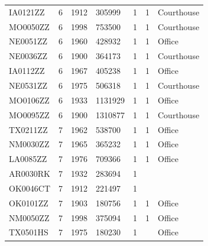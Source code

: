 \documentclass[12pt]{article}
\begin{document}
\begin{longtable}{lllllll}
IA0121ZZ         & 6      & 1912        & 305999                     & 1     & 1            & Courthouse                       \\
MO0050ZZ         & 6      & 1998        & 753500                     & 1     & 1            & Courthouse                       \\
NE0051ZZ         & 6      & 1960        & 428932                     & 1     & 1            & Office                           \\
NE0036ZZ         & 6      & 1900        & 364173                     & 1     & 1            & Courthouse                       \\
IA0112ZZ         & 6      & 1967        & 405238                     & 1     & 1            & Office                           \\
NE0531ZZ         & 6      & 1975        & 506318                     & 1     & 1            & Courthouse                       \\
MO0106ZZ         & 6      & 1933        & 1131929                    & 1     & 1            & Office                           \\
MO0095ZZ         & 6      & 1900        & 1310877                    & 1     & 1            & Courthouse                       \\
TX0211ZZ         & 7      & 1962        & 538700                     & 1     & 1            & Office                           \\
NM0030ZZ         & 7      & 1965        & 365232                     & 1     & 1            & Office                           \\
LA0085ZZ         & 7      & 1976        & 709366                     & 1     & 1            & Office                           \\
AR0030RK         & 7      & 1932        & 283694                     & 1     &              &                                  \\
OK0046CT         & 7      & 1912        & 221497                     & 1     &              &                                  \\
OK0101ZZ         & 7      & 1903        & 180756                     & 1     & 1            & Office                           \\
NM0050ZZ         & 7      & 1998        & 375094                     & 1     & 1            & Office                           \\
TX0501HS         & 7      & 1975        & 180230                     & 1     &              & Office                           \\

\end{longtable}
\end{document}
